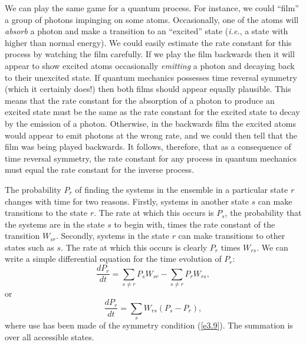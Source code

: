We can play the same game  for a quantum process. 
For instance, we could ``film'' a group of photons
impinging on some atoms. Occasionally, one of the atoms will {\em absorb}\/ a
photon and make a transition to an ``excited'' state ({\em i.e.},
a state with higher than
normal energy). We could easily estimate the rate constant for this process
by watching the film carefully. If we play the film backwards then it will appear to
show
excited atoms occasionally {\em emitting}\/ a photon and
decaying back to their unexcited state. If quantum mechanics possesses
time reversal symmetry (which it certainly does!) then both films should appear
equally plausible. This means that the rate constant for the absorption of
a photon to produce an excited state must be the same as the rate constant for
the excited state to decay by the emission of a photon. Otherwise, in the backwards
film the excited atoms would appear to emit photons at the wrong rate, and we could
then tell that the film was being played backwards. It follows, therefore, that
as a consequence of time reversal symmetry, the rate constant for any process in
quantum mechanics must equal the rate constant for the inverse process.

The probability $P_r$ of finding the systems in the ensemble
 in a particular state $r$ changes
with time for two reasons. Firstly, systems in another state $s$ can make transitions
to the state $r$. The rate at which this occurs is $P_s$, the probability
that the systems are in the state $s$ to begin with, times the rate constant
of the transition $W_{sr}$. Secondly, systems in the state $r$ can make
transitions to other states such as $s$. The rate at which this occurs
is clearly $P_r$ times $W_{rs}$. We can write a simple differential equation
for the time evolution of $P_r$:
\begin{equation}
\frac{dP_r}{dt} = \sum_{s\neq r} P_s W_{sr} - \sum_{s\neq r} P_r W_{rs},
\end{equation}
or
\begin{equation}
 \frac{dP_r}{dt} = \sum_{s} W_{rs}(P_s -P_r),\label{e3.11}
\end{equation}
where use has been made of the symmetry condition (\ref{e3.9}). The summation
is over all accessible states.

